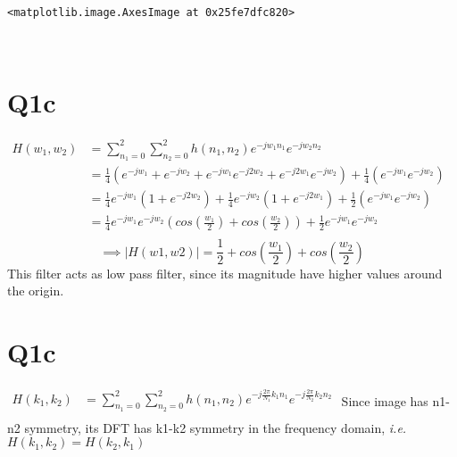 \documentclass[11pt]{article}
\makeatletter
\newcommand{\boxspacing}{\kern\kvtcb@left@rule\kern\kvtcb@boxsep}
\newcommand{\prompt}[4]{
        {\ttfamily\llap{{\color{#2}[#3]:\hspace{3pt}#4}}\vspace{-\baselineskip}}
    }
\makeatother
\begin{document}
            \begin{tcolorbox}[breakable, size=fbox, boxrule=.5pt, pad at break*=1mm, opacityfill=0]
\prompt{Out}{outcolor}{15}{\boxspacing}
\begin{Verbatim}[commandchars=\\\{\}]
<matplotlib.image.AxesImage at 0x25fe7dfc820>
\end{Verbatim}
\end{tcolorbox}
        
    \begin{center}
    \end{center}
    { \hspace*{\fill} \\}
    
    \hypertarget{q1c}{%
\section{Q1c}\label{q1c}}

\(\begin{align} H(w_1,w_2) &= \sum\limits_{n_1=0}^2\sum\limits_{n_2=0}^2 h(n_1,n_2) e^{-jw_1n_1} e^{-jw_2n_2} \\  &= \frac{1}{4}(e^{-jw_1}+e^{-jw_2}+e^{-jw_1}e^{-j2w_2}+e^{-j2w_1}e^{-jw_2}) + \frac{1}{4}(e^{-jw_1}e^{-jw_2}) \nonumber\\  &= \frac{1}{4}e^{-jw_1}(1+e^{-j2w_2}) + \frac{1}{4}e^{-jw_2}(1+e^{-j2w_1}) + \frac{1}{2}(e^{-jw_1}e^{-jw_2}) \nonumber\\  &= \frac{1}{4}e^{-jw_1}e^{-jw_2}(cos(\frac{w_1}{2})+cos(\frac{w_2}{2})) + \frac{1}{2} e^{-jw_1}e^{-jw_2} \nonumber\\ \end{align}\)
\[\implies |H(w1,w2)| = \frac{1}{2} + cos(\frac{w_1}{2})+cos(\frac{w_2}{2})\]
This filter acts as low pass filter, since its magnitude have higher
values around the origin.

    \hypertarget{q1c}{%
\section{Q1c}\label{q1c}}

\(\begin{align} H(k_1,k_2) &= \sum\limits_{n_1=0}^2\sum\limits_{n_2=0}^2 h(n_1,n_2) e^{-j{\frac{2\pi}{N_1}}k_1n_1} e^{-j{\frac{2\pi}{N_2}}k_2n_2} \\ \end{align}\)
Since image has n1-n2 symmetry, its DFT has k1-k2 symmetry in the
frequency domain, \emph{i.e.} \(H(k_1,k_2) = H(k_2,k_1)\)
\end{document}
